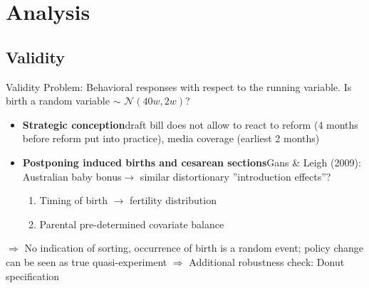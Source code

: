 \documentclass{beamer} %
\begin{document}
\section{Analysis}
\subsection{Validity}
\begin{frame}{Validity}
Problem: Behavioral responses with respect to the running variable. Is birth a random variable $\sim$ $\mathcal{N}(40w,2w)$?\pause
\begin{itemize}
\item \textbf{Strategic conception}\newline draft bill does not allow to react to reform (4 months before reform put into practice), media coverage (earliest 2 months)

\item \textbf{Postponing induced births and cesarean sections}\newline Gans \& Leigh (2009): Australian baby bonus\newline $\rightarrow$ similar distortionary ”introduction effects”?\pause



\begin{enumerate}
\item Timing of birth $\rightarrow$ fertility distribution
\item Parental pre-determined covariate balance
\end{enumerate}
\end{itemize}\pause
\medskip
$\Rightarrow$ No indication of sorting, occurrence of birth is a random event; policy change can be seen as true quasi-experiment \newline $\Rightarrow$ Additional robustness check: Donut specification
\end{frame}
\end{document}
